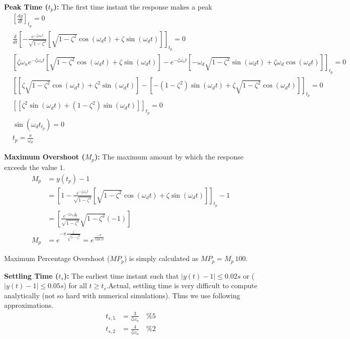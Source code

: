 \documentclass[twoside]{article}
\begin{document}
  \textbf{Peak Time ($t_p$):}  The first time instant the response makes a peak 
 \begin{align*}
& \left[  \frac{d y}{dt} \right]_{t_p} = 0
 \\
& \frac{d }{dt} \left[ - \frac{e^{-\zeta \omega_n t}}{ \sqrt{1 - \zeta^2} } \left[ \sqrt{1 - \zeta^2} \cos(\omega_d t) + \zeta \sin(\omega_d t) 
\right] \right]_{t_p} = 0
\\
& \left[ 
 \zeta \omega_n e^{-\zeta \omega_n t} \left[ \sqrt{1 - \zeta^2} \cos(\omega_d t) + \zeta \sin(\omega_d t) \right] -
e^{-\zeta \omega_n t} \left[ - \omega_d \sqrt{1 - \zeta^2} \sin(\omega_d t) + \zeta \omega_d \cos(\omega_d t) \right] 
\right]_{t_p} = 0
\\
& \left[ 
\left[  \zeta  \sqrt{1 - \zeta^2} \cos(\omega_d t) + \zeta^2 \sin(\omega_d t) \right] -
\left[ - (1 - \zeta^2) \sin(\omega_d t) + \zeta \sqrt{1 - \zeta^2} \cos(\omega_d t) \right] 
\right]_{t_p} = 0
\\
& \left[ 
 \left[  \zeta^2 \sin(\omega_d t) + (1 - \zeta^2) \sin(\omega_d t)  \right] 
\right]_{t_p} = 0
\\
&\sin(\omega_d t_{t_p})  = 0
\\
&t_p = \frac{\pi}{\omega_d}
\end{align*}
  
\textbf{Maximum Overshoot ($M_p$):}  The maximum amount by which the response exceeds the value $1$.
\begin{align*}
	M_p &= y(t_p) - 1
	\\
	&= \left[1 - \frac{e^{-\zeta \omega_n t}}{ \sqrt{1 - \zeta^2} } \left[ \sqrt{1 - \zeta^2} \cos(\omega_d t) + \zeta \sin(\omega_d t) 
\right] \right]_{t_p} - 1
\\
&= \left[ \frac{e^{-\zeta \omega_n \frac{\pi}{\omega_d}}}{ \sqrt{1 - \zeta^2} } \sqrt{1 - \zeta^2} (-1) \right] 
\\
M_p &= e^{-\pi  \frac{\zeta}{\ \sqrt{1 - \zeta^2}}} = e^{\frac{-\pi}{\tan \phi}} 
\end{align*}

Maximum Percentage Overshoot ($MP_p$) is simply calculated as $MP_p =
M_p \, 100$.

\textbf{Settling Time ($t_s$):}  The earliest time instant such that
$|y(t) - 1| \leq 0.02 s$ or ($|y(t) - 1| \leq 0.05 s$) for all $t \geq
t_s$.Actual, settling time is very difficult to compute analytically (not
so hard with numerical simulations). Thus we use following
approximations.
%
\begin{align*}
  t_{s,5} &=\frac{3}{\zeta \omega_n} \quad \%5 
\\ 
  t_{s,2} &=\frac{4}{\zeta \omega_n} \quad \%2
\end{align*} 
\end{document}
